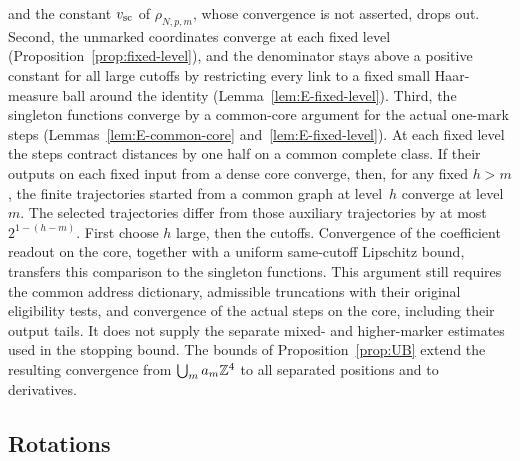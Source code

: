 and the constant $v_{\rm sc}$ of $\rho_{N,p,m}$, whose convergence is not asserted, drops out. Second, the unmarked coordinates converge at each fixed level (Proposition~\ref{prop:fixed-level}), and the denominator stays above a positive constant for all large cutoffs by restricting every link to a fixed small Haar-measure ball around the identity (Lemma~\ref{lem:E-fixed-level}). Third, the singleton functions converge by a common-core argument for the actual one-mark steps (Lemmas~\ref{lem:E-common-core} and~\ref{lem:E-fixed-level}). At each fixed level the steps contract distances by one half on a common complete class. If their outputs on each fixed input from a dense core converge, then, for any fixed $h>m$, the finite trajectories started from a common graph at level~$h$ converge at level~$m$. The selected trajectories differ from those auxiliary trajectories by at most $2^{1-(h-m)}$. First choose $h$ large, then the cutoffs. Convergence of the coefficient readout on the core, together with a uniform same-cutoff Lipschitz bound, transfers this comparison to the singleton functions. This argument still requires the common address dictionary, admissible truncations with their original eligibility tests, and convergence of the actual steps on the core, including their output tails. It does not supply the separate mixed- and higher-marker estimates used in the stopping bound. The bounds of Proposition~\ref{prop:UB} extend the resulting convergence from $\bigcup_ma_m\mathbb{Z}^4$ to all separated positions and to derivatives.

\subsection{Rotations}\label{sec:strategy-rotations}

